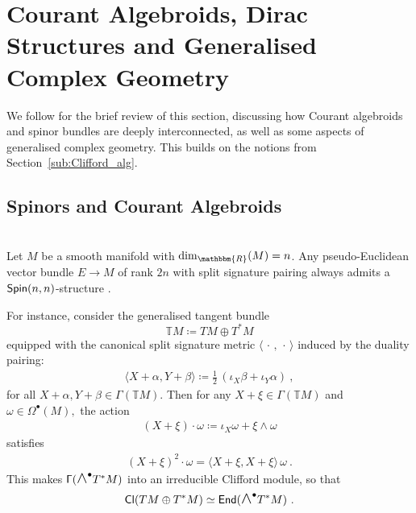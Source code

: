 \documentclass[a4paper, reqno, 11pt]{amsart}
\numberwithin{equation}{section}
\theoremstyle{definition}
\newcommand{\sfgamma}{\mathsf{\Gamma}}
\newcommand{\ip}[1]{\langle #1 \rangle}
\newcommand{\IR}{\mathbbm{R}}
\newcommand{\IT}{\mathbb{T}}
\newcommand{\Cl}{\mathsf{Cl}}
\newcommand{\sfGamma}{{\mathsf{\Gamma}}}
\newcommand{\sfOmega}{{\mathsf{\Omega}}}
\newcommand{\midwedge}{\text {\Large$\wedge$}}
\theoremstyle{remark}
\begin{document}
\section{Courant Algebroids, Dirac Structures and Generalised Complex Geometry} \label{sect:section3}
We follow \cite{gualtieri:tesi, Alekseev2001} for the brief review of this section, discussing how Courant algebroids and spinor bundles are deeply interconnected, as well as some aspects of generalised complex geometry. This builds on the notions from Section~\ref{sub:Clifford_alg}.

\medskip

\subsection{Spinors and Courant Algebroids}~\\[5pt]
Let $M$ be a smooth manifold with ${\rm dim}_\IR(M)=n$. 
Any pseudo-Euclidean vector bundle $E\to M$ of rank $2n$ with split signature pairing always admits a ${\sf Spin}(n,n)$-structure \cite{gualtieri:tesi}. 

For instance, consider the generalised tangent bundle $$\IT M \coloneqq TM \oplus T^*M$$ equipped with the canonical split signature metric $\ip{\, \cdot\, , \, \cdot\,}$ induced by the duality pairing:
\begin{align}
    \ip{X+\alpha, Y+\beta} \coloneqq \tfrac12\,(\iota_X \beta+ \iota_Y \alpha) \ ,
\end{align}
for all $X+ \alpha, Y + \beta \in \sfgamma(\IT M)$.
Then for any $X + \xi \in \sfGamma(\IT M)$ and $\omega \in \sfOmega^\bullet(M),$ the action 
\begin{align} \label{eqn:cliffaction}
    (X + \xi) \cdot \omega \coloneqq \iota_X \omega + \xi \wedge \omega
\end{align}
satisfies
\begin{align}
   (X + \xi)^2 \cdot \omega = \ip{X+ \xi,X + \xi} \, \omega \ .
\end{align}
This makes $\sfGamma(\midwedge^\bullet T^*M)$ into an irreducible Clifford module, so that
\begin{align}
    \Cl(TM \oplus T^*M) \simeq {\sf End}(\midwedge^\bullet T^*M) \ .
\end{align}
\end{document}
